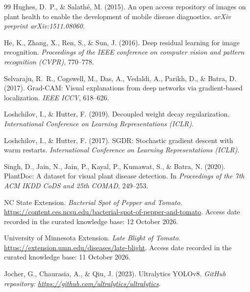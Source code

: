 \documentclass[11pt,a4paper]{article}
\renewcommand{\_}{\textunderscore\allowbreak}
\begin{document}






\begin{thebibliography}{99}
Hughes, D.~P., \& Salath{\'e}, M. (2015).
An open access repository of images on plant health to enable the development of mobile disease diagnostics.
\emph{arXiv preprint arXiv:1511.08060}.

He, K., Zhang, X., Ren, S., \& Sun, J. (2016).
Deep residual learning for image recognition.
\emph{Proceedings of the IEEE conference on computer vision and pattern recognition (CVPR)}, 770--778.

Selvaraju, R.~R., Cogswell, M., Das, A., Vedaldi, A., Parikh, D., \& Batra, D. (2017).
Grad-CAM: Visual explanations from deep networks via gradient-based localization.
\emph{IEEE ICCV}, 618--626.

Loshchilov, I., \& Hutter, F. (2019).
Decoupled weight decay regularization.
\emph{International Conference on Learning Representations (ICLR)}.

Loshchilov, I., \& Hutter, F. (2017).
SGDR: Stochastic gradient descent with warm restarts.
\emph{International Conference on Learning Representations (ICLR)}.

Singh, D., Jain, N., Jain, P., Kayal, P., Kumawat, S., \& Batra, N. (2020).
PlantDoc: A dataset for visual plant disease detection.
In \emph{Proceedings of the 7th ACM IKDD CoDS and 25th COMAD}, 249--253.

NC State Extension.
\emph{Bacterial Spot of Pepper and Tomato}.
\url{https://content.ces.ncsu.edu/bacterial-spot-of-pepper-and-tomato}.
Access date recorded in the curated knowledge base: 12 October 2026.

University of Minnesota Extension.
\emph{Late Blight of Tomato}.
\url{https://extension.umn.edu/diseases/late-blight}.
Access date recorded in the curated knowledge base: 11 October 2026.

Jocher, G., Chaurasia, A., \& Qiu, J. (2023).
Ultralytics YOLOv8.
\emph{GitHub repository: \url{https://github.com/ultralytics/ultralytics}}.
\end{thebibliography}
\end{document}
